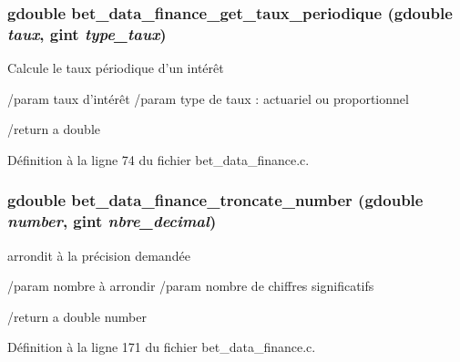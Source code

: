 \subsubsection[{bet\_\-data\_\-finance\_\-get\_\-taux\_\-periodique}]{\setlength{\rightskip}{0pt plus 5cm}gdouble bet\_\-data\_\-finance\_\-get\_\-taux\_\-periodique (gdouble {\em taux}, \/  gint {\em type\_\-taux})}\label{bet__data__finance_8h_ad31dc1b97b1e3874d40e5dae112aa66c}
Calcule le taux périodique d'un intérêt

/param taux d'intérêt /param type de taux : actuariel ou proportionnel

/return a double 

Définition à la ligne 74 du fichier bet\_\-data\_\-finance.c.

\subsubsection[{bet\_\-data\_\-finance\_\-troncate\_\-number}]{\setlength{\rightskip}{0pt plus 5cm}gdouble bet\_\-data\_\-finance\_\-troncate\_\-number (gdouble {\em number}, \/  gint {\em nbre\_\-decimal})}\label{bet__data__finance_8h_a6e87f9712fa8d75a50417f77f17cf53e}
arrondit à la précision demandée

/param nombre à arrondir /param nombre de chiffres significatifs

/return a double number 

Définition à la ligne 171 du fichier bet\_\-data\_\-finance.c.

